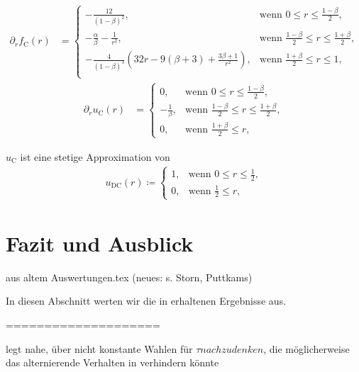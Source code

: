 \begin{align*}
  \partial_r f_\textrm{C}(r) &= 
  \begin{cases}
    -\frac{12}{(1-\beta)^2},&\text{wenn }0\leq r\leq\frac{1-\beta}{2},\\
    -\frac{\alpha}{\beta}-\frac{1}{r^2},&
    \text{wenn } \frac{1-\beta}{2}\leq r\leq \frac{1+\beta}{2},\\
    -\frac{4}{(1-\beta)^3}\left( 32r-9(\beta+3)+\frac{3\beta+1}{r^2} \right),&
    \text{wenn } \frac{1+\beta}{2}\leq r\leq 1,\\
  \end{cases}
\end{align*}
\begin{align*}
  \partial_r u_\textrm{C}(r) &= 
  \begin{cases}
    0,&\text{wenn }0\leq r\leq\frac{1-\beta}{2},\\
    -\frac{1}{\beta},&
    \text{wenn } \frac{1-\beta}{2}\leq r\leq \frac{1+\beta}{2},\\
    0,&\text{wenn } \frac{1+\beta}{2}\leq r,
  \end{cases}
\end{align*}

$u_\textrm{C}$ ist eine stetige Approximation von
\begin{align*}
  u_\textrm{DC}(r)\coloneqq 
  \begin{cases}
    1, & \text{wenn } 0\leq r\leq\frac{1}{2},\\
    0, & \text{wenn } \frac{1}{2}\leq r,
  \end{cases}
\end{align*}


\section{Fazit und Ausblick}

aus altem Auswertungen.tex (neues: s. Storn, Puttkams)

In diesen Abschnitt werten wir die in  erhaltenen
Ergebnisse aus.


====================

 legt nahe, über nicht konstante Wahlen für
$\tau nachzudenken$, die möglicherweise das alternierende Verhalten in
 verhindern könnte

